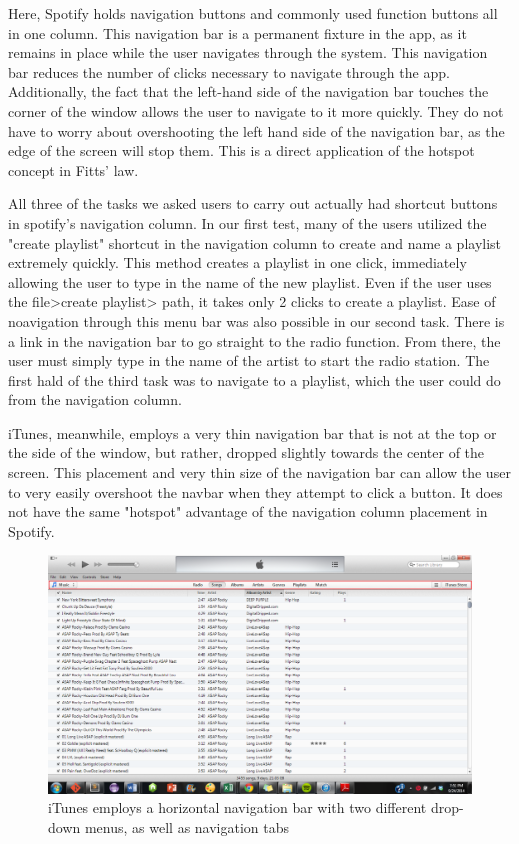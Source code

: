 \documentclass[12pt]{report}
\begin{document}
Here, Spotify holds navigation buttons and commonly used function buttons all in one column. This navigation bar is a permanent fixture in the app, as it remains in place while the user navigates through the system. This navigation bar reduces the number of clicks necessary to navigate through the app. Additionally, the fact that the left-hand side of the navigation bar touches the corner of the window allows the user to navigate to it more quickly. They do not have to worry about overshooting the left hand side of the navigation bar, as the edge of the screen will stop them. This is a direct application of the hotspot concept in Fitts' law.

 All three of the tasks we asked users to carry out actually had shortcut buttons in spotify's navigation column. In our first test, many of the users utilized the "create playlist" shortcut in the navigation column to create and name a playlist extremely quickly. This method creates a playlist in one click, immediately allowing the user to type in the name of the new playlist. Even if the user uses the file>create playlist> path, it takes only 2 clicks to create a playlist. Ease of noavigation through this menu bar was also possible in our second task. There is a link in the navigation bar to go straight to the radio function. From there, the user must simply type in the name of the artist to start the radio station. The first hald of the third task was to navigate to a playlist, which the user could do from the navigation column.

iTunes, meanwhile, employs a very thin navigation bar that is not at the top or the side of the window, but rather, dropped slightly towards the center of the screen. This placement and very thin size of the navigation bar can allow the user to very easily overshoot the navbar when they attempt to click a button. It does not have the same "hotspot" advantage of the navigation column placement in Spotify.

\begin{figure}[H]
	\centering
	\includegraphics[width=\textwidth]{chart5.png}
	\caption{iTunes employs a horizontal navigation bar with two different drop-down menus, as well as navigation tabs}
\end{figure}
\end{document}
